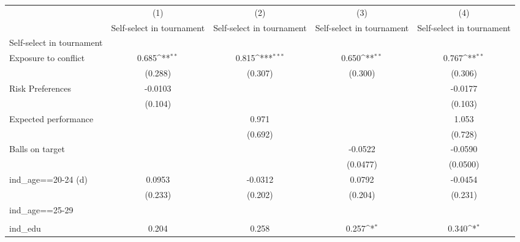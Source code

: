 {
\def\sym#1{\ifmmode^{#1}\else\(^{#1}\)\fi}
\begin{tabular}{l*{4}{c}}
\hline\hline
                    &\multicolumn{1}{c}{(1)}&\multicolumn{1}{c}{(2)}&\multicolumn{1}{c}{(3)}&\multicolumn{1}{c}{(4)}\\
                    &\multicolumn{1}{c}{Self-select in tournament}&\multicolumn{1}{c}{Self-select in tournament}&\multicolumn{1}{c}{Self-select in tournament}&\multicolumn{1}{c}{Self-select in tournament}\\
\hline
Self-select in tournament&                     &                     &                     &                     \\
Exposure to conflict&       0.685\sym{**} &       0.815\sym{***}&       0.650\sym{**} &       0.767\sym{**} \\
                    &     (0.288)         &     (0.307)         &     (0.300)         &     (0.306)         \\
[1em]
Risk Preferences    &     -0.0103         &                     &                     &     -0.0177         \\
                    &     (0.104)         &                     &                     &     (0.103)         \\
[1em]
Expected performance&                     &       0.971         &                     &       1.053         \\
                    &                     &     (0.692)         &                     &     (0.728)         \\
[1em]
Balls on target     &                     &                     &     -0.0522         &     -0.0590         \\
                    &                     &                     &    (0.0477)         &    (0.0500)         \\
[1em]
ind\_age==20-24 (d)  &      0.0953         &     -0.0312         &      0.0792         &     -0.0454         \\
                    &     (0.233)         &     (0.202)         &     (0.204)         &     (0.231)         \\
[1em]
ind\_age==25-29      &                     &                     &                     &                     \\
                    &                     &                     &                     &                     \\
[1em]
ind\_edu             &       0.204         &       0.258         &       0.257\sym{*}  &       0.340\sym{*}  \\

\end{tabular}}
